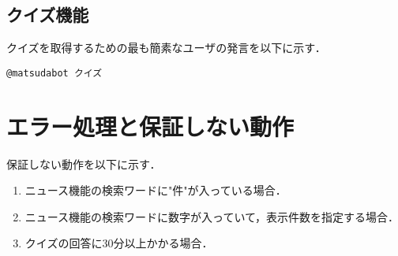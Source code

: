 \documentclass[12pt]{jsarticle}
\begin{document}
\subsection{クイズ機能}
クイズを取得するための最も簡素なユーザの発言を以下に示す．
\begin{verbatim}
@matsudabot クイズ
\end{verbatim}

\section{エラー処理と保証しない動作}
保証しない動作を以下に示す．
\begin{enumerate}
\item ニュース機能の検索ワードに"件"が入っている場合．\\
\item ニュース機能の検索ワードに数字が入っていて，表示件数を指定する場合．\\
\item クイズの回答に30分以上かかる場合．\\
\end{enumerate}



\end{document}
